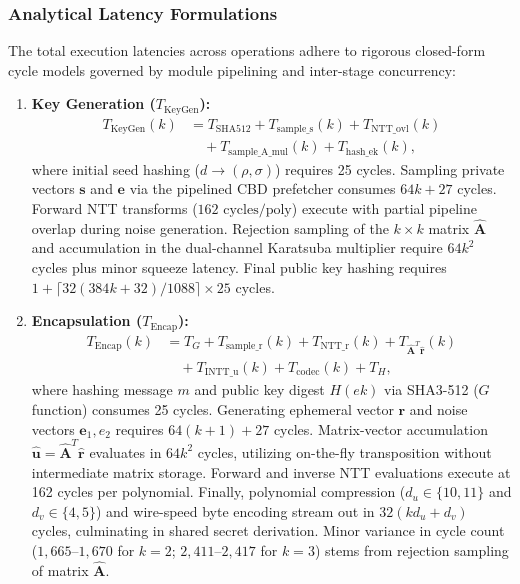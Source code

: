\subsubsection{Analytical Latency Formulations}
The total execution latencies across operations adhere to rigorous closed-form cycle models governed by module pipelining and inter-stage concurrency:

\begin{enumerate}
    \item \textbf{Key Generation ($T_{\text{KeyGen}}$):}
    \begin{align}
    \label{eq:latency_keygen}
    T_{\text{KeyGen}}(k) &= T_{\text{SHA512}} + T_{\text{sample\_s}}(k) + T_{\text{NTT\_ovl}}(k) \nonumber \\
    &\quad + T_{\text{sample\_A\_mul}}(k) + T_{\text{hash\_ek}}(k),
    \end{align}
    where initial seed hashing ($d \to (\rho, \sigma)$) requires 25 cycles. Sampling private vectors $\mathbf{s}$ and $\mathbf{e}$ via the pipelined CBD prefetcher consumes $64k + 27$ cycles. Forward NTT transforms ($162\text{ cycles/poly}$) execute with partial pipeline overlap during noise generation. Rejection sampling of the $k \times k$ matrix $\hat{\mathbf{A}}$ and accumulation in the dual-channel Karatsuba multiplier require $64k^2$ cycles plus minor squeeze latency. Final public key hashing requires $1 + \lceil 32(384k + 32) / 1088 \rceil \times 25$ cycles.
    
    \item \textbf{Encapsulation ($T_{\text{Encap}}$):}
    \begin{align}
    \label{eq:latency_encap}
    T_{\text{Encap}}(k) &= T_{G} + T_{\text{sample\_r}}(k) + T_{\text{NTT\_r}}(k) + T_{\hat{\mathbf{A}}^T \hat{\mathbf{r}}}(k) \nonumber \\
    &\quad + T_{\text{INTT\_u}}(k) + T_{\text{codec}}(k) + T_{H},
    \end{align}
    where hashing message $m$ and public key digest $H(ek)$ via SHA3-512 ($G$ function) consumes 25 cycles. Generating ephemeral vector $\mathbf{r}$ and noise vectors $\mathbf{e}_1, e_2$ requires $64(k+1) + 27$ cycles. Matrix-vector accumulation $\hat{\mathbf{u}} = \hat{\mathbf{A}}^T \hat{\mathbf{r}}$ evaluates in $64k^2$ cycles, utilizing on-the-fly transposition without intermediate matrix storage. Forward and inverse NTT evaluations execute at 162 cycles per polynomial. Finally, polynomial compression ($d_u \in \{10, 11\}$ and $d_v \in \{4, 5\}$) and wire-speed byte encoding stream out in $32(kd_u + d_v)$ cycles, culminating in shared secret derivation. Minor variance in cycle count ($1,665$--$1,670$ for $k=2$; $2,411$--$2,417$ for $k=3$) stems from rejection sampling of matrix $\hat{\mathbf{A}}$.


\end{enumerate}
